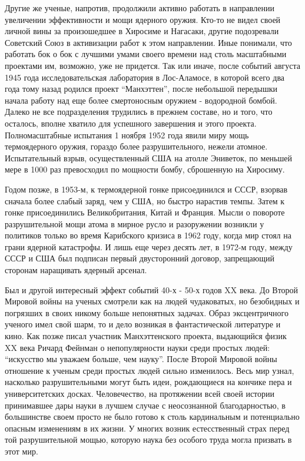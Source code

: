 Другие же ученые, напротив, продолжили активно работать в направлении увеличении эффективности и мощи ядерного оружия.
Кто-то не видел своей личной вины за произошедшее в Хиросиме и Нагасаки, другие подозревали Советский Союз в активизации работ к этом направлении.
Иные понимали, что работать бок о бок с лучшими умами своего времени над столь масштабными проектами им, возможно, уже не придется. 
Так или иначе, после событий августа 1945 года исследовательская лаборатория в Лос-Аламосе, в которой всего два года тому назад родился проект ``Манхэттен'', после небольшой передышки начала работу над еще более смертоносным оружием - водородной бомбой.
Далеко не все подразделения трудились в прежнем составе, но и того, что осталось, вполне хватило для успешного завершения и этого проекта. 
Полномасштабные испытания 1 ноября 1952 года явили миру мощь термоядерного оружия, гораздо более разрушительного, нежели атомное.
Испытательный взрыв, осуществленный США на атолле Эниветок, по меньшей мере в 1000 раз превосходил по мощности бомбу, сброшенную на Хиросиму.

Годом позже, в 1953-м, к термоядерной гонке присоединился и СССР, взорвав сначала более слабый заряд, чем у США, но быстро нарастив темпы. 
Затем к гонке присоединились Великобритания, Китай и Франция.
Мысли о повороте разрушительной мощи атома в мирное русло и разоружении возникли у политиков только во время Карибского кризиса в 1962 году, когда мир стоял на грани ядерной катастрофы. 
И лишь еще через десять лет, в 1972-м году, между СССР и США был подписан первый двусторонний договор, запрещающий сторонам наращивать ядерный арсенал.

Был и другой интересный эффект событий 40-х - 50-х годов XX века.
До Второй Мировой войны на ученых смотрели как на людей чудаковатых, но безобидных и погрязших в своих никому больше непонятных задачах. 
Образ эксцентричного ученого имел свой шарм, то и дело возникая в фантастической литературе и кино.
Как позже писал участник Манхэттенского проекта, выдающийся физик XX века Ричард Фейнман о непопулярности науки среди простых людей: ``искусство мы уважаем больше, чем науку''.
После Второй Мировой войны отношение к ученым среди простых людей сильно изменилось.
Весь мир узнал, насколько разрушительными могут быть идеи, рождающиеся на кончике пера и университетских досках.
Человечество, на протяжении всей своей истории принимавшее дары науки в лучшем случае с неосознанной благодарностью, в большинстве своем просто не было готово к столь кардинальным и потенциально опасным изменениям в их жизни.
У многих возник естесственный страх перед той разрушительной мощью, которую наука без особого труда могла призвать в этот мир. 

